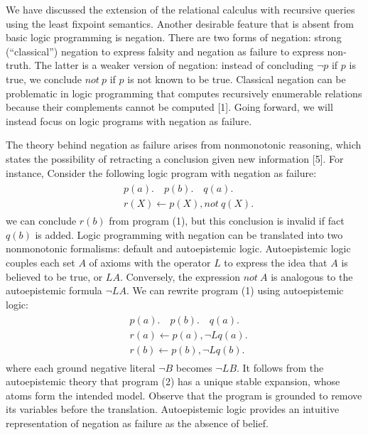 We have discussed the extension of the relational calculus with recursive queries 
using the least fixpoint semantics. Another desirable feature that is absent from 
basic logic programming is negation. There are two forms of negation: strong (``classical'') 
negation to express falsity and negation as failure to express non-truth. The 
latter is a weaker version of negation: instead of concluding 
$\neg p$ if $p$ is true, we conclude $not \: p$ if $p$ is not known to be true. 
Classical negation can be problematic in logic programming that computes 
recursively enumerable relations because their complements cannot be computed [1]. 
Going forward, we will instead focus on logic programs with negation as failure. 

The theory behind negation as failure arises from nonmonotonic reasoning, which states 
the possibility of retracting a conclusion given new information [5]. For instance, 
Consider the following logic program with negation as failure:
\begin{align}
    \begin{split}
        & p(a). \hspace{1em} p(b). \hspace{1em} q(a). \\
        & r(X) \leftarrow p(X), not \: q(X).
    \end{split}
\end{align}
we can conclude $r(b)$ from 
program (1), but this conclusion is invalid if fact $q(b)$ is added. Logic programming with 
negation can be translated into two nonmonotonic formalisms: default and autoepistemic logic. 
Autoepistemic logic couples each set $A$ of axioms with the operator $L$ to express the idea that 
$A$ is believed to be true, or $LA$. Conversely, the expression $not \: A$ is analogous to the 
autoepistemic formula $\neg LA$. We can rewrite program (1) using autoepistemic logic:
\begin{align}
    \begin{split}
        & p(a). \hspace{1em} p(b). \hspace{1em} q(a). \\
        & r(a) \leftarrow p(a), \neg Lq(a). \\ 
        & r(b) \leftarrow p(b), \neg Lq(b).
    \end{split}
\end{align}
where each ground negative literal $\neg B$ becomes $\neg LB$. It follows from the 
autoepistemic theory that program (2) has a unique stable expansion, whose atoms 
form the intended model. Observe that the program is 
grounded to remove its variables before the translation. Autoepistemic logic provides an intuitive 
representation of negation as failure as the absence of belief. 

